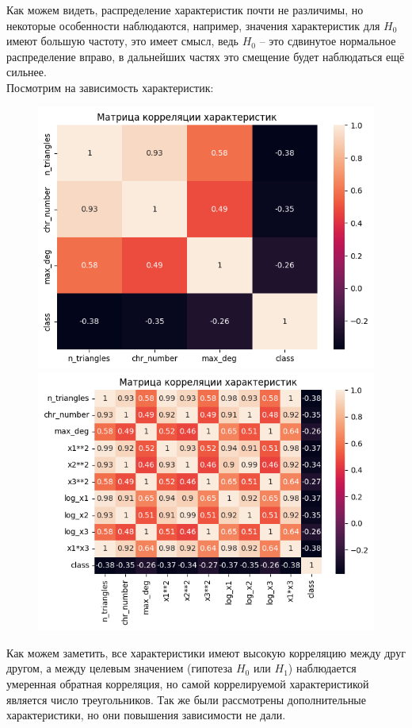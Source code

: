 \documentclass{report}
\begin{document}
Как можем видеть, распределение характеристик почти не различимы, но некоторые особенности наблюдаются, например, значения характеристик для $H_0$ имеют большую частоту, это имеет смысл, ведь $H_0$ -- это сдвинутое нормальное распределение вправо, в дальнейших частях это смещение будет наблюдаться ещё сильнее.\\

Посмотрим на зависимость характеристик:
\begin{figure}[h]
    \centering
    \includegraphics[width=0.4\linewidth]{n_10_corr.png}
    \centering
    \includegraphics[width=0.4\linewidth]{n_10_extra_corr.png}
\end{figure}

Как можем заметить, все характеристики имеют высокую корреляцию между друг другом, а между целевым значением (гипотеза $H_0$ или $H_1$) наблюдается умеренная обратная корреляция, но самой коррелируемой характеристикой является число треугольников. Так же были рассмотрены дополнительные характеристики, но они повышения зависимости не дали.

\newpage
\end{document}
